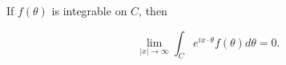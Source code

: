 If $f(\theta)$ is integrable on $C$, then

$$\lim_{|x| \to \infty} \int_C e^{ix \cdot \theta} f(\theta) d\theta = 0.$$